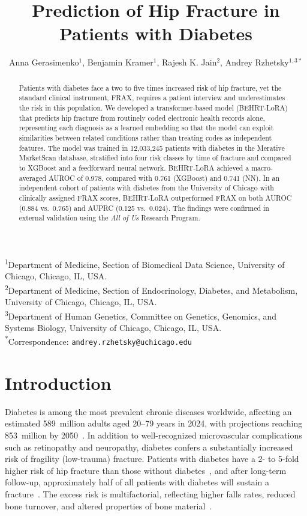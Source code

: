 \documentclass[12pt]{article}
\title{Prediction of Hip Fracture in Patients with Diabetes}
\author{Anna Gerasimenko$^1$, Benjamin Kramer$^1$, Rajesh K. Jain$^2$, Andrey Rzhetsky$^{1,3*}$}
\date{}
\begin{document}
\maketitle

\begin{abstract}
Patients with diabetes face a two to five times increased risk of hip
fracture, yet the standard clinical instrument, FRAX, requires a patient
interview and underestimates the risk in this population. We developed a
transformer-based model (BEHRT-LoRA) that predicts hip fracture from
routinely coded electronic health records alone, representing each
diagnosis as a learned embedding so that the model can exploit
similarities between related conditions rather than treating codes as
independent features. The model was trained in 12{,}033{,}245 patients
with diabetes in the Merative MarketScan database, stratified into four
risk classes by time of fracture and compared to XGBoost and a
feedforward neural network. BEHRT-LoRA achieved a macro-averaged AUROC
of 0.978, compared with 0.761 (XGBoost) and 0.741 (NN). In an
independent cohort of patients with diabetes from the University of Chicago with clinically
assigned FRAX scores, BEHRT-LoRA outperformed FRAX on both AUROC
(0.884 vs.\ 0.765) and AUPRC (0.125 vs.\ 0.024). The findings were
confirmed in external validation using the \textit{All of Us} Research
Program.\end{abstract}

\noindent
\textsuperscript{1}Department of Medicine, Section of Biomedical Data Science, University of Chicago, Chicago, IL, USA.\\
\textsuperscript{2}Department of Medicine, Section of Endocrinology, Diabetes, and Metabolism, University of Chicago, Chicago, IL, USA.\\
\textsuperscript{3}Department of Human Genetics, Committee on Genetics, Genomics, and Systems Biology, University of Chicago, Chicago, IL, USA.\\

\textsuperscript{*}Correspondence: \texttt{andrey.rzhetsky@uchicago.edu}

\section{Introduction}

Diabetes is among the most prevalent chronic diseases worldwide, affecting an estimated 589~million adults aged 20--79 years in 2024, with projections reaching 853~million by 2050~\citep{IDF2025Atlas,Genitsaridi2026Lancet}. In addition to well-recognized microvascular complications such as retinopathy and neuropathy, diabetes confers a substantially increased risk of fragility (low-trauma) fracture. Patients with diabetes have a 2- to 5-fold higher risk of hip fracture than those without diabetes~\citep{Schwartz2001JCEM,Vestergaard2005Diabetologia,Giangregorio2012JBMR,Sellmeyer2016Diabetes,Janghorbani2006DiabetesCare}, and after long-term follow-up, approximately half of all patients with diabetes will sustain a fracture~\citep{Melton2008JBMR}. The excess risk is multifactorial, reflecting higher falls rates, reduced bone turnover, and altered properties of bone material~\citep{Pijpers2012AgeAgeing,Hygum2017EJE,Furst2016JCEM}.
\end{document}
